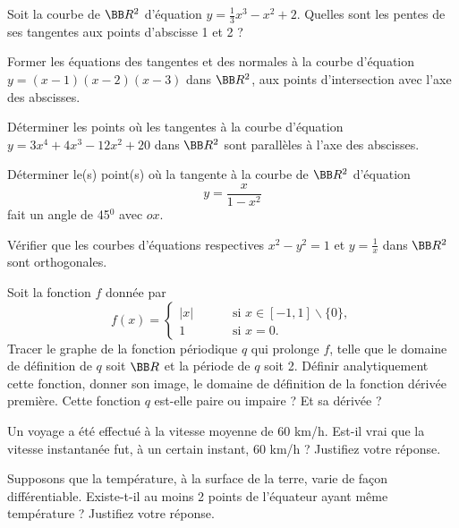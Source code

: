 \documentclass[12pt,french,oneside,a4paper]{memoir} %
\begin{document}
\begin{exo}
Soit la courbe de $\BB R^2$ d'équation
 $y=\frac{1}{3}x^3-x^2+2$. Quelles sont les pentes de ses tangentes
 aux points d'abscisse 1 et 2 ?
\end{exo}

\begin{exo}
Former les équations des tangentes et des normales à la
 courbe d'équation $y=(x-1)(x-2)(x-3)$ dans $\BB R^2$, aux points
 d'intersection avec l'axe des abscisses.
\end{exo}

\begin{exo}
Déterminer les points où les tangentes à la courbe
 d'équation $y=3x^4+4x^3-12x^2+20$ dans $\BB R^2$ sont parallèles
 à l'axe des abscisses.
\end{exo}

\begin{exo}
Déterminer le(s) point(s) où la tangente à la courbe de
 $\BB R^2$ d'équation
 \begin{equation*}
 y=\frac{x}{1-x^2}
\end{equation*}
 fait un angle de 45$^0$ avec $ox$.
\end{exo}
\begin{exo}
Vérifier que les courbes d'équations respectives
 $x^2-y^2=1$ et $y=\displaystyle{\frac{1}{x}}$ dans $\BB R^2$ sont
 orthogonales.
\end{exo}
\begin{exo}
Soit la fonction $f$ donnée par
 \begin{equation*}
 f(x)=
 \left\{
 \begin{array}{cl}
 |x|\qquad&\mbox{ si } x\in[-1,1]\backslash\{0\},\\
 1\qquad&\mbox{ si } x=0.
 \end{array}
 \right.
\end{equation*}
 Tracer le graphe de la fonction périodique $q$ qui prolonge $f$,
 telle que le domaine de définition de $q$ soit $\BB R$ et la
 période de $q$ soit 2. Définir analytiquement cette fonction,
 donner son image, le domaine de définition de la fonction
 dérivée première. Cette fonction $q$ est-elle paire ou
 impaire ? Et sa dérivée ?
\end{exo}

\begin{exo}
Un voyage a été effectué à la vitesse moyenne de 60
 km/h. Est-il vrai que la vitesse instantanée fut, à un
 certain instant, 60 km/h ? Justifiez votre réponse.
\end{exo}
\begin{exo}
 Supposons que la température, à la surface de la terre,
 varie de façon différentiable. Existe-t-il au moins 2 points
 de l'équateur ayant même température ? Justifiez votre
 réponse.
\end{exo}
\end{document}
